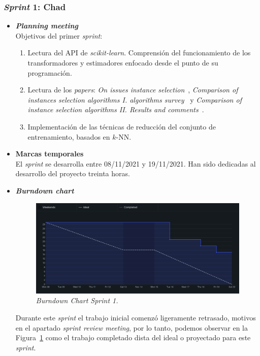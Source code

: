 \subsubsection{\textit{Sprint} 1: Chad}
\begin{itemize}
\item \textbf{\textit{Planning meeting}}\\
Objetivos del primer \textit{sprint}:
\begin{enumerate}
\item Lectura del API de \textit{scikit-learn}. Comprensión del funcionamiento de los transformadores y estimadores enfocado desde el punto de su programación.
\item Lectura de los \textit{papers}: \textit{On issues instance selection}~\cite{liu2002issues}, \textit{Comparison of instances selection algorithms I. algorithms survey}~\cite{jankowski2004comparison} y \textit{Comparison of instance selection algorithms II. Results and comments}~\cite{grochowski2004comparison}.
\item Implementación de las técnicas de reducción del conjunto de entrenamiento, basados en $k$-NN.
\end{enumerate}

\item \textbf{Marcas temporales}\\
El \textit{sprint} se desarrolla entre 08/11/2021 y 19/11/2021. Han sido dedicadas al desarrollo del proyecto treinta horas.

\item \textbf{\textit{Burndown chart}}\\
\begin{figure}
\begin{center}
\includegraphics[width=\textwidth]{../img/anexos/sprints/BD-Sprint1}
\caption{\textit{Burndown Chart Sprint 1.}}\label{fig:BD-Sprint1}
\end{center}
\end{figure}
Durante este \textit{sprint} el trabajo inicial comenzó ligeramente retrasado, motivos en el apartado \textit{sprint review meeting}, por lo tanto, podemos observar en la Figura~\ref{fig:BD-Sprint1} como el trabajo completado dista del ideal o proyectado para este \textit{sprint}.


\end{itemize}
